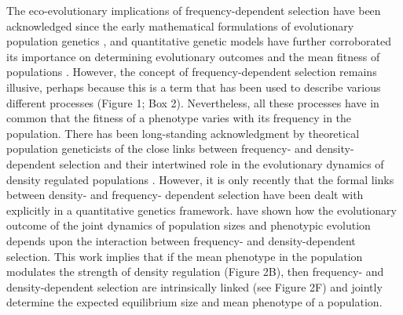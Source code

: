 \documentclass{article}
\begin{document}
The eco-evolutionary implications of frequency-dependent selection have been acknowledged since the early mathematical formulations of evolutionary population genetics \citep{Fisher1930, Wright1948}, and quantitative genetic models have further corroborated its importance on determining evolutionary outcomes and the mean fitness of populations \citep{Lande1976, Lande2007, Svensson2018, Engen2020}. However, the concept of frequency-dependent selection remains illusive, perhaps because this is a term that has been used to describe various different processes (Figure 1; Box 2). Nevertheless, all these processes have in common that the fitness of a phenotype varies with its frequency in the population. There has been long-standing acknowledgment by theoretical population geneticists of the close links between frequency- and density-dependent selection and their intertwined role in the evolutionary dynamics of density regulated populations \citep{Smouse1976, Anderson1983, Heino1998, Joshi2001}. However, it is only recently that the formal links between density- and frequency- dependent selection have been dealt with explicitly in a quantitative genetics framework. \cite{Engen2020} have shown how the evolutionary outcome of the joint dynamics of population sizes and phenotypic evolution depends upon the interaction between frequency- and density-dependent selection. This work implies that if the mean phenotype in the population modulates the strength of density regulation (Figure 2B), then frequency- and density-dependent selection are intrinsically linked (see Figure 2F) and jointly determine the expected equilibrium size and mean phenotype of a population.
 
\end{document}
